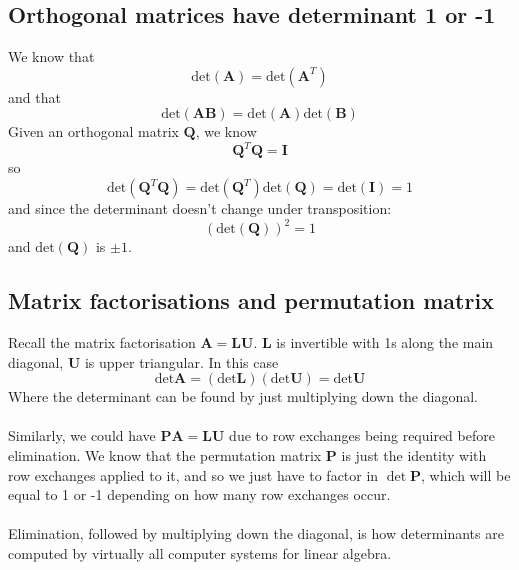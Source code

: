 \documentclass{report}
\begin{document}
\subsection{Orthogonal matrices have determinant 1 or -1}
We know that
\begin{equation*}
\text{det}(\bm A)=\text{det}(\bm A^T)
\end{equation*}
and that
\begin{equation*}
\text{det}(\bm{AB})=\text{det}(\bm A)\text{det}(\bm B)
\end{equation*}
Given an orthogonal matrix $\bm Q$, we know
\begin{equation*}
\bm Q^T\bm Q=\bm I
\end{equation*}
so
\begin{equation*}
\text{det}(\bm Q^T\bm Q)=\text{det}(\bm Q^T)\text{det}(\bm Q)=\text{det}(\bm I)=1
\end{equation*}
and since the determinant doesn't change under transposition:
\begin{equation*}
(\text{det}(\bm Q))^2=1
\end{equation*}
and $\text{det}(\bm Q)$ is $\pm1$.

\subsection{Matrix factorisations and permutation matrix}
Recall the matrix factorisation $\bm A=\bm{LU}$. $\bm L$ is invertible with 1s along the main diagonal, $\bm U$ is upper triangular. In this case
\begin{equation*}
\text{det}\bm A=(\text{det}\bm L)(\text{det}\bm U)=\text{det}\bm U
\end{equation*}
Where the determinant can be found by just multiplying down the diagonal.\\
\vspace{1mm}\\
Similarly, we could have $\bm{PA}=\bm{LU}$ due to row exchanges being required before elimination. We know that the permutation matrix $\bm P$ is just the identity with 
row exchanges applied to it, and so we just have to factor in
$\det\bm P$, which will be equal to 1 or -1 depending on how many row exchanges occur.\\
\vspace{1mm}\\
Elimination, followed by multiplying down the diagonal, is how determinants are computed by virtually all computer systems for linear algebra.
\newpage
\end{document}
